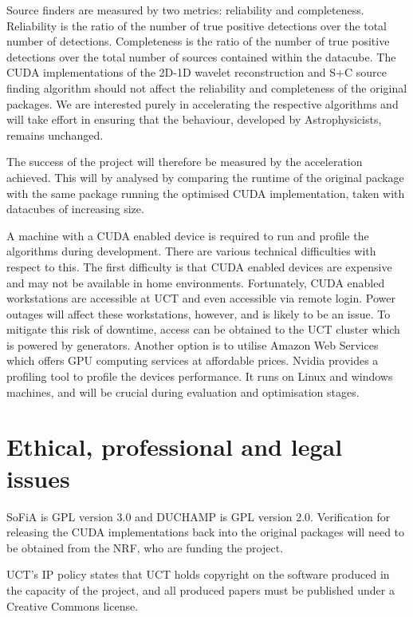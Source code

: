 \documentclass[prodmode,acmtecs]{acmsmall} \usepackage[ruled]{algorithm2e}
\begin{document}
Source finders are measured by two metrics: reliability and completeness. Reliability is the ratio of the number of true positive detections over the total number of detections. Completeness is the ratio of the number of true positive detections over the total number of sources contained within the datacube. The CUDA implementations of the 2D-1D wavelet reconstruction and S+C source finding algorithm should not affect the reliability and completeness of the original packages. We are
interested purely in accelerating the respective algorithms and will take effort in ensuring that the behaviour, developed by Astrophysicists, remains unchanged.


The success of the project will therefore be measured by the acceleration achieved. This will by analysed by comparing the runtime of the original package with the same package running the optimised CUDA implementation, taken with datacubes of increasing size.




A machine with a CUDA enabled device is required to run and profile the algorithms during development. There are various technical difficulties with respect to this. The first difficulty is that CUDA enabled devices are expensive and may not be available in home environments. Fortunately, CUDA enabled workstations are accessible at UCT and even accessible via remote login. Power outages will affect these workstations, however, and is likely to be an issue. To mitigate this risk of
downtime, access can be obtained to the UCT cluster which is powered by generators. Another option is to utilise Amazon Web Services which offers GPU computing services at affordable prices. Nvidia provides a profiling tool to profile the devices performance. It runs on Linux and windows machines, and will be crucial during evaluation and optimisation stages.


\section{Ethical, professional and legal issues}


SoFiA is GPL version 3.0 and  DUCHAMP is GPL version 2.0.  Verification for releasing the CUDA implementations back into the original packages will need to be obtained from the NRF, who are funding the project.


UCT’s IP policy states that UCT holds copyright on the software produced in the capacity of the project, and all produced papers must be published under a Creative Commons license.
\end{document}
